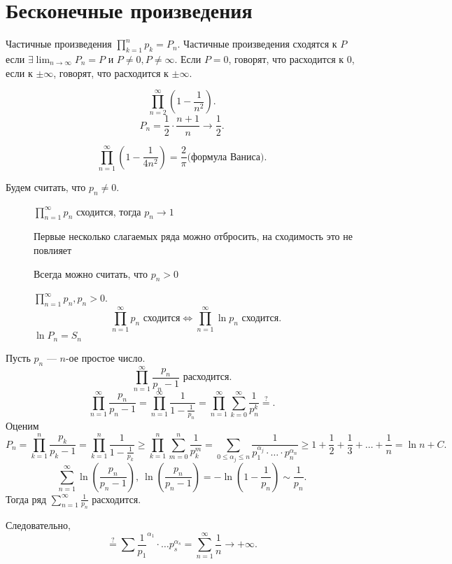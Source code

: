 \section{Бесконечные произведения}
\begin{defn}
    Частичные произведения $ \prod_{k=1}^{n}p_k =P_n$. Частичные произведения сходятся к $ P$если  $ \exists  \lim_{n \to \infty} P_n = P$ и $ P\ne 0, P \ne \infty$. Если $ P=0$, говорят, что расходится к 0, если к  $ \pm \infty$, говорят, что расходится к $ \pm \infty$.
\end{defn}
\begin{ex}
    \[
	\prod_{n=2}^{\infty}\left(1- \frac{1}{n^2}\right)
    .\] 
    \[
	P_n = \frac{1}{2}\cdot \frac{n+1}{n} \to  \frac{1}{2}
    .\] 
\end{ex}
\begin{ex}
    \[
	\prod_{n=1}^{\infty} \left( 1 - \frac{1}{4n^2} \right)  = \frac{2}{\pi} \text{(формула Ваниса)}
    .\] 
\end{ex}
\begin{prop}
    Будем считать, что $ p_n \ne 0$.
    \begin{description}
	\item[]  $ \prod_{n=1}^{\infty} p_n$ сходится, тогда $ p_n \to  1$ 
	\item[]  Первые несколько слагаемых ряда можно отбросить, на сходимость это не повлияет
	\item[] Всегда можно считать, что $ p_n > 0$
	\item[] $ \prod_{n=1}^{\infty}p_n, p_n >0$. 
	    \[
	    \prod_{n=1}^{\infty} p_n \text{ сходится} \Longleftrightarrow \prod_{n=1}^{\infty} \ln p_n \text{ сходится}
	    .\] 
	    $ \ln P_n = S_n$
    \end{description}
\end{prop}
\begin{ex}
    Пусть $ p_n$ --- $ n$-ое простое число. 
    \[
	\prod _{n=1}^{\infty} \frac{p_n}{p_n-1} \text{ расходится}
    .\] 
    \[
	\prod_{n=1}^{\infty} \frac{p_n}{p_n -1}= \prod_{n=1}^{\infty} \frac{1}{1- \frac{1}{p_n}} = \prod_{n=1}^{\infty}\sum_{k=0}^{\infty} \frac{1}{p_n^{k}} \stackrel{?}{=}
    .\] 
    Оценим
    \[
	P_n =  \prod_{k=1}^{n} \frac{p_k}{p_k -1} = \prod _{k=1}^{n} \frac{1}{1-\frac{1}{p_k}} \ge \prod _{k=1}^{n} \sum_{m=0}^{n} \frac{1}{p_k^{m}} = \sum_{0 \le \alpha_j \le  n }^{}  \frac{1}{p_1^{ \alpha _j} \cdot  \ldots  \cdot  p_n^{ \alpha _n}} \ge 1 + \frac{1}{2} + \frac{1}{3} + \ldots +\frac{1}{n} = \ln n + C
    .\] 
    \[
	\sum_{n=1}^{\infty} \ln\left( \frac{p_n}{p_n-1} \right) , ~ \ln\left( \frac{p_n}{p_n -1} \right) = - \ln\left( 1- \frac{1}{p_n} \right) \sim \frac{1}{p_n}
    .\] 
    Тогда ряд $ \sum_{n=1}^{\infty} \frac{1}{p_n}$ расходится.

   Следовательно,
   \[
   \stackrel{?}{=} \sum_{}^{} \frac{1}{p_1}^{ \alpha _1} \cdot  \ldots  p_s ^{ \alpha _s} = \sum_{n=1}^{\infty} \frac{1}{n} \to  +\infty
   .\] 
\end{ex}
% 
